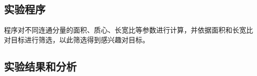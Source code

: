 \subsection{实验程序}
程序对不同连通分量的面积、质心、长宽比等参数进行计算，并依据面积和长宽比对目标进行筛选，以此筛选得到感兴趣对目标。






\subsection{实验结果和分析}
